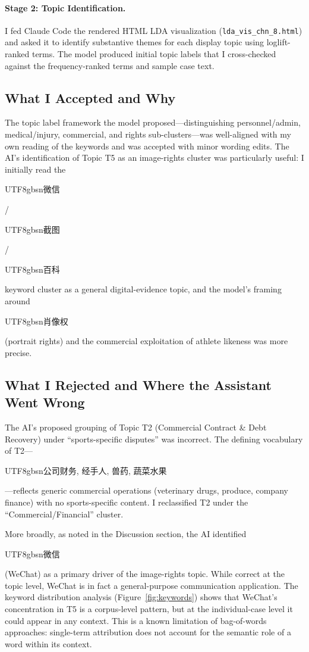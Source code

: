 \documentclass[10pt,letterpaper]{article}
\begin{document}
\paragraph{Stage 2: Topic Identification.}
I fed Claude Code the rendered HTML LDA visualization (\texttt{lda\_vis\_chn\_8.html}) and asked it to identify substantive themes for each display topic using loglift-ranked terms. The model produced initial topic labels that I cross-checked against the frequency-ranked terms and sample case text.

\subsection*{What I Accepted and Why}

The topic label framework the model proposed---distinguishing personnel/admin, medical/injury, commercial, and rights sub-clusters---was well-aligned with my own reading of the keywords and was accepted with minor wording edits. The AI's identification of Topic T5 as an image-rights cluster was particularly useful: I initially read the \begin{CJK}{UTF8}{gbsn}微信\end{CJK}/\begin{CJK}{UTF8}{gbsn}截图\end{CJK}/\begin{CJK}{UTF8}{gbsn}百科\end{CJK} keyword cluster as a general digital-evidence topic, and the model's framing around \begin{CJK}{UTF8}{gbsn}肖像权\end{CJK} (portrait rights) and the commercial exploitation of athlete likeness was more precise.

\subsection*{What I Rejected and Where the Assistant Went Wrong}

The AI's proposed grouping of Topic T2 (Commercial Contract \& Debt Recovery) under ``sports-specific disputes'' was incorrect. The defining vocabulary of T2---\begin{CJK}{UTF8}{gbsn}公司财务, 经手人, 兽药, 蔬菜水果\end{CJK}---reflects generic commercial operations (veterinary drugs, produce, company finance) with no sports-specific content. I reclassified T2 under the ``Commercial/Financial'' cluster.

More broadly, as noted in the Discussion section, the AI identified \begin{CJK}{UTF8}{gbsn}微信\end{CJK} (WeChat) as a primary driver of the image-rights topic. While correct at the topic level, WeChat is in fact a general-purpose communication application. The keyword distribution analysis (Figure~\ref{fig:keywords}) shows that WeChat's concentration in T5 is a corpus-level pattern, but at the individual-case level it could appear in any context. This is a known limitation of bag-of-words approaches: single-term attribution does not account for the semantic role of a word within its context.
\end{document}
